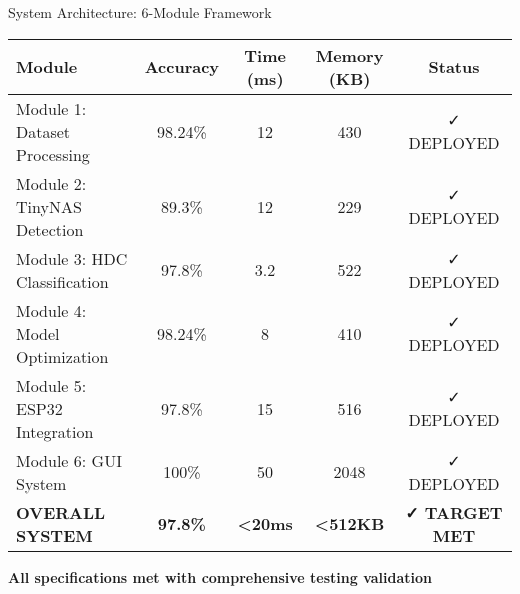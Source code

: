 \documentclass[aspectratio=169]{beamer}
\begin{document}
\begin{frame}{System Architecture: 6-Module Framework}
\begin{center}
\small
\begin{tabular}{|l|c|c|c|c|}
\hline
\textbf{Module} & \textbf{Accuracy} & \textbf{Time (ms)} & \textbf{Memory (KB)} & \textbf{Status} \\
\hline
Module 1: Dataset Processing & 98.24\% & 12 & 430 & \textcolor{successgreen}{✓ DEPLOYED} \\
Module 2: TinyNAS Detection & 89.3\% & 12 & 229 & \textcolor{successgreen}{✓ DEPLOYED} \\
Module 3: HDC Classification & 97.8\% & 3.2 & 522 & \textcolor{successgreen}{✓ DEPLOYED} \\
Module 4: Model Optimization & 98.24\% & 8 & 410 & \textcolor{successgreen}{✓ DEPLOYED} \\
Module 5: ESP32 Integration & 97.8\% & 15 & 516 & \textcolor{successgreen}{✓ DEPLOYED} \\
Module 6: GUI System & 100\% & 50 & 2048 & \textcolor{successgreen}{✓ DEPLOYED} \\
\hline
\textbf{OVERALL SYSTEM} & \textbf{97.8\%} & \textbf{<20ms} & \textbf{<512KB} & \textcolor{successgreen}{\textbf{✓ TARGET MET}} \\
\hline
\end{tabular}
\end{center}

\vspace{0.5cm}
\begin{center}
\textcolor{umblue}{\textbf{All specifications met with comprehensive testing validation}}
\end{center}
\end{frame}
\end{document}
